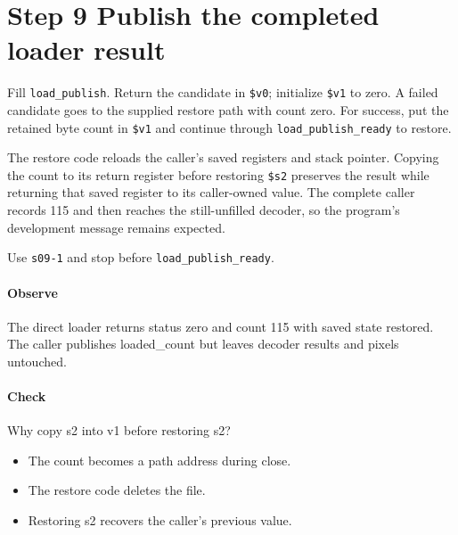 \section{Step 9 Publish the completed loader result}\label{png-load-s09}
Fill \texttt{load\_publish}. Return the candidate in \texttt{\$v0}; initialize \texttt{\$v1} to zero. A failed candidate goes to the supplied restore path with count zero. For success, put the retained byte count in \texttt{\$v1} and continue through \texttt{load\_publish\_ready} to restore.

The restore code reloads the caller's saved registers and stack pointer. Copying the count to its return register before restoring \texttt{\$s2} preserves the result while returning that saved register to its caller-owned value. The complete caller records 115 and then reaches the still-unfilled decoder, so the program's development message remains expected.

Use \texttt{s09-1} and stop before \texttt{load\_publish\_ready}.

\paragraph{Observe} The direct loader returns status zero and count 115 with saved state restored. The caller publishes loaded\_count but leaves decoder results and pixels untouched.

\paragraph{Check} Why copy s2 into v1 before restoring s2?
\begin{itemize}
  \item[A.] The count becomes a path address during close.
  \item[B.] The restore code deletes the file.
  \item[C.] Restoring s2 recovers the caller's previous value.
\end{itemize}
